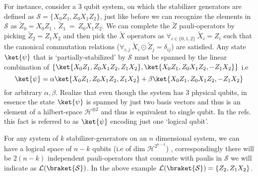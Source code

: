 \documentclass[
]{article}
\begin{document}
For instance, consider a 3 qubit system, on which the stabilizer
generators are defined as
\(\mathcal{S} = \{X_{0} Z_{1}, Z_{0}X_{1}Z_{2} \}\), just like before we
can recognize the elements in \(\mathcal{S}\) as
\(\tilde{Z}_{0}= X_{0}Z_{1} \:, \: \tilde{Z}_{1} \:= \: Z_{0}X_{1}Z_{2}\).
We can complete the \(\tilde{Z}\) pauli-operators by picking
\(\tilde{Z}_{2}= Z_{1}X_{2}\) and then pick the \(\tilde{X}\) operators
as \(\forall_{i\in \{0,1,2\}} \:\tilde{X}_{i}= Z_{i}\) such that the
canonical commutation relations
(\(\forall_{i,j} \:\tilde{X}_{i}\odot \tilde{Z}_{j} = \delta_{ij}\)) are
satisfied. Any state \(\ket{\psi}\) that is `partially-stabilized' by
\(\mathcal{S}\) must be spanned by the linear combination of
\(\{\ket{X_{0} Z_{1}, Z_{0}X_{1}Z_{2}, Z_{1}X_{2}} , \ket{X_{0} Z_{1}, Z_{0}X_{1}Z_{2}, -Z_{1}X_{2}} \}\)
i.e
\[\ket{\psi} = \alpha \ket{X_{0} Z_{1}, Z_{0}X_{1}Z_{2}, Z_{1}X_{2}} + \beta \ket{X_{0} Z_{1}, Z_{0}X_{1}Z_{2}, -Z_{1}X_{2}}\]for
arbitrary \(\alpha, \beta\). Realize that even though the system has 3
physical qubits, in essence the state \(\ket{\psi}\) is spanned by just
two basis vectors and thus is an element of a hilbert-space
\(\mathcal{H}^{\otimes 2}\) and thus is equivalent to single qubit. In
the refs. this fact is referred to as \(\ket{\psi}\) encoding just one
`logical qubit'.

For any system of \(k\) stabilizer-generators on an \(n\) dimensional
system, we can have a logical space of \(n-k\) qubits (i.e of dim
\(\mathcal{H}^{2^{n-k}}\)) , correspondingly there will be \(2(n-k)\)
independent pauli-operators that commute with paulis in \(\mathcal{S}\)
we will indicate as \(\mathcal{L}(\braket{\mathcal{S}})\). In the above
example \(\mathcal{L}(\braket{\mathcal{S}})= \{Z_{2}, Z_{1}X_{2}\}\).
\end{document}
